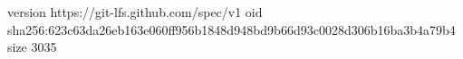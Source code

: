 version https://git-lfs.github.com/spec/v1
oid sha256:623c63da26eb163e060ff956b1848d948bd9b66d93c0028d306b16ba3b4a79b4
size 3035
